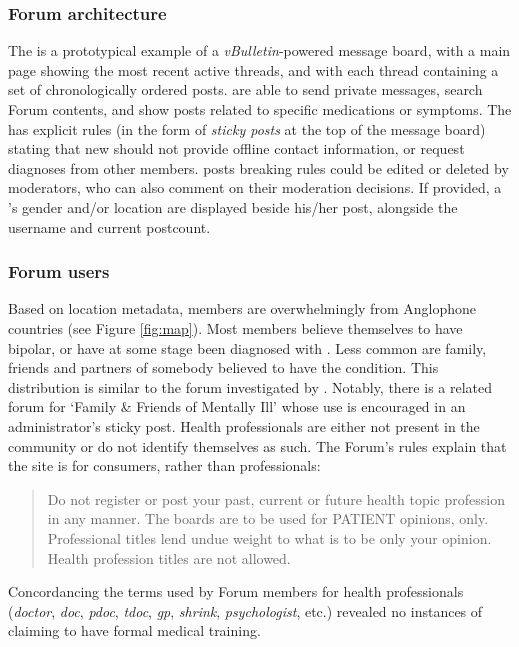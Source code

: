 \subsubsection{Forum architecture}

The  is a prototypical example of a \emph{vBulletin}-powered message board, with a main page showing the most recent active \glspl{thread}, and with each \gls{thread} containing a set of chronologically ordered \glspl{post}.  are able to send private messages, search \gls{Forum} contents, and show \glspl{post} related to specific medications or symptoms. The  has explicit rules (in the form of \emph{sticky \glspl{post}} at the top of the message board) stating that new  should not provide offline contact information, or request diagnoses from other \glspl{member}. \Glspl{post} breaking rules could be edited or deleted by moderators, who can also comment on their moderation decisions. If provided, a 's gender and\slash or location are displayed beside his\slash her \gls{post}, alongside the username and current postcount.

\subsubsection{Forum users}

Based on location metadata, \glspl{member} are overwhelmingly from Anglophone countries (see Figure \ref{fig:map}). Most members believe themselves to have \gls{bipolar}, or have at some stage been diagnosed with . Less common are family, friends and partners of somebody believed to have the condition. This distribution is similar to the \gls{forum} investigated by \textcite{vayreda_social_2009}. Notably, there is a related \gls{forum} for `Family \& Friends of Mentally Ill' whose use is encouraged in an administrator's sticky \gls{post}. Health professionals are either not present in the community or do not identify themselves as such. The \gls{Forum}'s rules explain that the site is for \glspl{consumer}, rather than professionals:

\begin{quote} \singlespacing \small
Do not register or post your past, current or future health topic profession in any manner. The boards are to be used for PATIENT opinions, only. Professional titles lend undue weight to what is to be only your opinion. Health profession titles are not allowed. %
\end{quote}
%
Concordancing the terms used by \gls{Forum} \glspl{member} for health professionals (\emph{doctor}, \emph{doc}, \emph{pdoc}, \emph{tdoc}, \emph{gp}, \emph{shrink}, \emph{psychologist}, etc.) revealed no instances of  claiming to have formal medical training.

